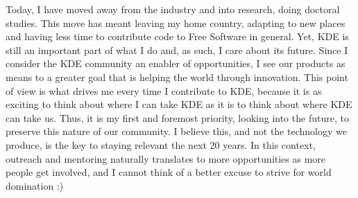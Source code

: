 Today, I have moved away from the industry and into research, doing
doctoral studies. This move has meant leaving my home country,
adapting to new places and having less time to contribute code to Free
Software in general. Yet, KDE is still an important part of what I do
and, as such, I care about its future. Since I consider the KDE
community an enabler of opportunities, I see our products as means to
a greater goal that is helping the world through innovation. This
point of view is what drives me every time I contribute to KDE,
because it is as exciting to think about where I can take KDE as it is
to think about where KDE can take us. Thus, it is my first and
foremost priority, looking into the future, to preserve this nature of
our community. I believe this, and not the technology we produce, is
the key to staying relevant the next 20 years. In this context, outreach
and mentoring naturally translates to more opportunities as more
people get involved, and I cannot think of a better excuse to strive
for world domination :)
